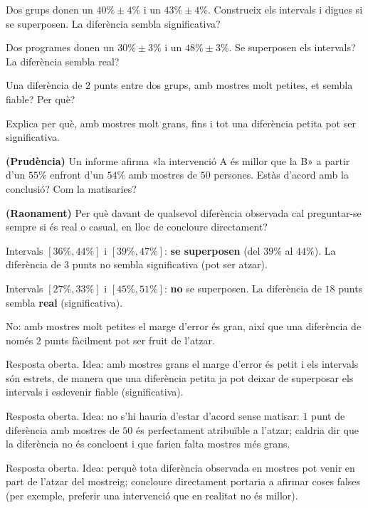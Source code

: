 \begin{exercicis}
\begin{exlist}
  \item Dos grups donen un $40\%\pm 4\%$ i un $43\%\pm 4\%$. Construeix els intervals i
        digues si se superposen. La diferència sembla significativa?
  \item Dos programes donen un $30\%\pm 3\%$ i un $48\%\pm 3\%$. Se superposen els
        intervals? La diferència sembla real?
  \item Una diferència de $2$ punts entre dos grups, amb mostres molt petites, et sembla
        fiable? Per què?
  \item Explica per què, amb mostres molt grans, fins i tot una diferència petita pot ser
        significativa.
  \item \textbf{(Prudència)} Un informe afirma «la intervenció A és millor que la B» a
        partir d'un $55\%$ enfront d'un $54\%$ amb mostres de $50$ persones. Estàs d'acord
        amb la conclusió? Com la matisaries?
  \item \textbf{(Raonament)} Per què davant de qualsevol diferència observada cal
        preguntar-se sempre si és real o casual, en lloc de concloure directament?
\end{exlist}
\end{exercicis}

\begin{solucions}
\begin{sollist}
  \item Intervals $[36\%,44\%]$ i $[39\%,47\%]$: \textbf{se superposen} (del $39\%$ al
        $44\%$). La diferència de $3$ punts no sembla significativa (pot ser atzar).
  \item Intervals $[27\%,33\%]$ i $[45\%,51\%]$: \textbf{no} se superposen. La diferència
        de $18$ punts sembla \textbf{real} (significativa).
  \item No: amb mostres molt petites el marge d'error és gran, així que una diferència de
        només $2$ punts fàcilment pot ser fruit de l'atzar.
  \item Resposta oberta. Idea: amb mostres grans el marge d'error és petit i els intervals
        són estrets, de manera que una diferència petita ja pot deixar de superposar els
        intervals i esdevenir fiable (significativa).
  \item Resposta oberta. Idea: no s'hi hauria d'estar d'acord sense matisar: $1$ punt de
        diferència amb mostres de $50$ és perfectament atribuïble a l'atzar; caldria dir
        que la diferència no és concloent i que farien falta mostres més grans.
  \item Resposta oberta. Idea: perquè tota diferència observada en mostres pot venir en
        part de l'atzar del mostreig; concloure directament portaria a afirmar coses falses
        (per exemple, preferir una intervenció que en realitat no és millor).
\end{sollist}
\end{solucions}
